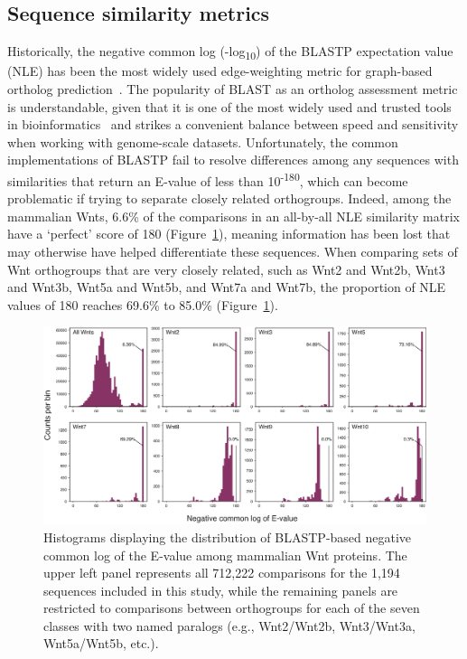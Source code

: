 \documentclass[twocolumn]{bmcart}  %
\begin{document}
\subsection{Sequence similarity metrics}\label{subsec:sequenceSimilarityMetrics}
Historically, the negative common log (-log\textsubscript{10}) of the BLASTP expectation value (NLE) has been the most widely used edge-weighting metric for graph-based ortholog prediction~\cite{Enright:2002uq,Li:2003en,Gibbons:2015be}.
The popularity of BLAST as an ortholog assessment metric is understandable, given that it is one of the most widely used and trusted tools in bioinformatics~\cite{Altschul:1990dy} and strikes a convenient balance between speed and sensitivity when working with genome-scale datasets.
Unfortunately, the common implementations of BLASTP fail to resolve differences among any sequences with similarities that return an E-value of less than 10\textsuperscript{-180}, which can become problematic if trying to separate closely related orthogroups.
Indeed, among the mammalian Wnts, 6.6\% of the comparisons in an all-by-all NLE similarity matrix have a `perfect' score of 180 (Figure~\ref{fig:NLEdistributions}), meaning information has been lost that may otherwise have helped differentiate these sequences.
When comparing sets of Wnt orthogroups that are very closely related, such as Wnt2 and Wnt2b, Wnt3 and Wnt3b, Wnt5a and Wnt5b, and Wnt7a and Wnt7b, the proportion of NLE values of 180 reaches 69.6\% to 85.0\% (Figure~\ref{fig:NLEdistributions}).


\begin{figure}[t]
  \begin{center}
  \includegraphics[height=0.34\textheight]{../figures/NLE_distributions.eps}
\end{center}
\caption{Histograms displaying the distribution of BLASTP-based negative common log of the E-value among mammalian Wnt proteins.
The upper left panel represents all 712,222 comparisons for the 1,194 sequences included in this study, while the remaining panels are restricted to comparisons between orthogroups for each of the seven classes with two named paralogs (e.g., Wnt2/Wnt2b, Wnt3/Wnt3a, Wnt5a/Wnt5b, etc.).}
\label{fig:NLEdistributions}
\end{figure}
\end{document}

